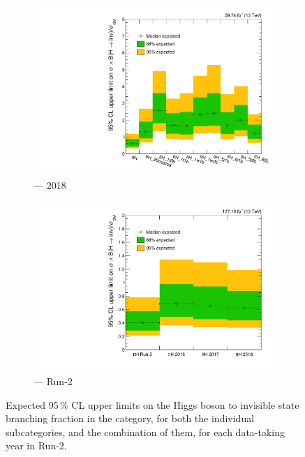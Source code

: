 \begin{figure}[htbp]
    \begin{subfigure}[b]{0.45\textwidth}
        \includegraphics[width=\textwidth]{figures/limits/ttH/limit_2018_ttH_Scenario5.pdf}
        \caption{\ttH --- 2018}
    \end{subfigure}
    \hfill
    \begin{subfigure}[b]{0.45\textwidth}
        \includegraphics[width=\textwidth]{figures/limits/ttH/limit_Run2_ttH_Scenario5.pdf}
        \caption{\ttH --- Run-2}
    \end{subfigure}
    \caption[Expected 95\,\% CL upper limits on the Higgs boson to invisible state branching fraction in the \ttH category, for both the individual subcategories, and the combination of them, for each data-taking year in Run-2]{Expected 95\,\% CL upper limits on the Higgs boson to invisible state branching fraction in the \ttH category, for both the individual subcategories, and the combination of them, for each data-taking year in Run-2.}
    \label{fig:htoinv_limit_ttH}
\end{figure}


